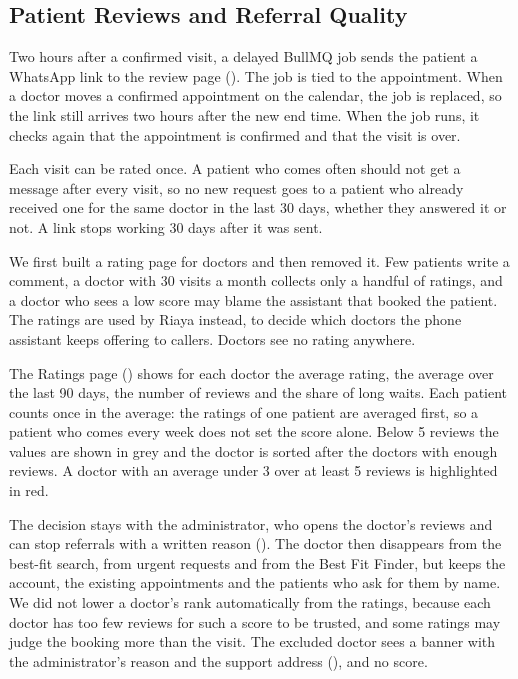 \subsection{Patient Reviews and Referral Quality}\label{subsec:reviews}

Two hours after a confirmed visit, a delayed BullMQ job sends the patient a WhatsApp link to the review page (). The job is tied to the appointment. When a doctor moves a confirmed appointment on the calendar, the job is replaced, so the link still arrives two hours after the new end time. When the job runs, it checks again that the appointment is confirmed and that the visit is over.

Each visit can be rated once. A patient who comes often should not get a message after every visit, so no new request goes to a patient who already received one for the same doctor in the last 30 days, whether they answered it or not. A link stops working 30 days after it was sent.

We first built a rating page for doctors and then removed it. Few patients write a comment, a doctor with 30 visits a month collects only a handful of ratings, and a doctor who sees a low score may blame the assistant that booked the patient. The ratings are used by Riaya instead, to decide which doctors the phone assistant keeps offering to callers. Doctors see no rating anywhere.

The Ratings page () shows for each doctor the average rating, the average over the last 90 days, the number of reviews and the share of long waits. Each patient counts once in the average: the ratings of one patient are averaged first, so a patient who comes every week does not set the score alone. Below 5 reviews the values are shown in grey and the doctor is sorted after the doctors with enough reviews. A doctor with an average under 3 over at least 5 reviews is highlighted in red.

The decision stays with the administrator, who opens the doctor's reviews and can stop referrals with a written reason (). The doctor then disappears from the best-fit search, from urgent requests and from the Best Fit Finder, but keeps the account, the existing appointments and the patients who ask for them by name. We did not lower a doctor's rank automatically from the ratings, because each doctor has too few reviews for such a score to be trusted, and some ratings may judge the booking more than the visit. The excluded doctor sees a banner with the administrator's reason and the support address (), and no score.

